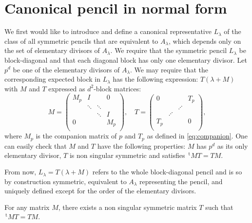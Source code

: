 \documentclass{lms}%
\def\transpose{\,{}^{\mathrm{t}\!}}
\begin{document}
\section{Canonical pencil in normal form}
We first would like to introduce and define a canonical representative $L_\lambda$ of the class of all symmetric pencils that are equivalent to $A_\lambda$, which depends only on the set of elementary divisors of $A_{\lambda}$. We require that the symmetric pencil $L_\lambda$ be block-diagonal and that each diagonal block has only one elementary divisor. 
Let $p^d$ be one of the elementary divisors of $A_{\lambda}$. We may require that the corresponding expected block in $L_\lambda$ has the following expression: $T(\lambda +M)$ with $M$ and $T$ expressed as $d^2$-block matrices:
\begin{equation}
\label{eq:canonical}
M=\begin{pmatrix}
M_p & I & & 0\\
 & \ddots & \ddots & \\
 & & \ddots & I \\
0 & & & M_p\\
\end{pmatrix}
,\quad 
T =\begin{pmatrix}
0& & & T_p\\
& & \iddots & \\
& \iddots & & \\
T_p & & & 0\\	
\end{pmatrix},
\end{equation}
where $M_p$ is the companion matrix of $p$ and $T_p$ as defined in \eqref{eq:companion}.
One can easily check that $M$ and $T$ have the following properties: $M$ has $p^d$ as its only elementary divisor, $T$ is non singular symmetric and satisfies $\transpose{M}T=TM$.

From now, $L_\lambda=T(\lambda + M)$ refers to the whole block-diagonal pencil and is so by construction symmetric, equivalent to $A_\lambda$ representing the pencil, and uniquely defined except for the order of the elementary divisors.
\begin{prop}
\label{transpose-symmetric}
For any matrix $M$, 
there exists a non singular symmetric matrix $T$ such that $\transpose{M}T = TM$.
\end{prop}
\end{document}
